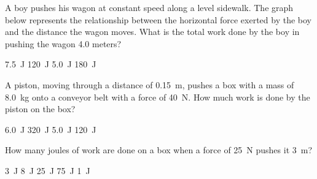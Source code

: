 \documentclass[../main-physics-problems.tex]{subfiles}
\begin{document}
\begin{questions}
\question
A boy pushes his wagon at constant speed along a level sidewalk. The graph below represents the relationship between the horizontal force exerted by the boy and the distance the wagon moves. What is the total work done by the boy in pushing the wagon 4.0 meters?

\begin{center}
\end{center}

\begin{randomizechoices}
\choice \SI{7.5}{J}
\correctchoice \SI{120}{J}
\choice \SI{5.0}{J}
\choice \SI{180}{J}
\end{randomizechoices}

\question
A piston, moving through a distance of \SI{0.15}{m}, pushes a box with a mass of \SI{8.0}{kg} onto a conveyor belt with a force of \SI{40}{N}. How much work is done by the piston on the box?

\begin{randomizechoices}
\correctchoice \SI{6.0}{J}
\choice \SI{320}{J}
\choice \SI{5.0}{J}
\choice \SI{120}{J}
\end{randomizechoices}

\question
How many joules of work are done on a box when a force of \SI{25}{N} pushes it \SI{3}{m}?

\begin{randomizechoices}
\choice \SI{3}{J}
\choice \SI{8}{J}
\choice \SI{25}{J}
\correctchoice \SI{75}{J}
\choice \SI{1}{J}
\end{randomizechoices}
\end{questions}
\end{document}

